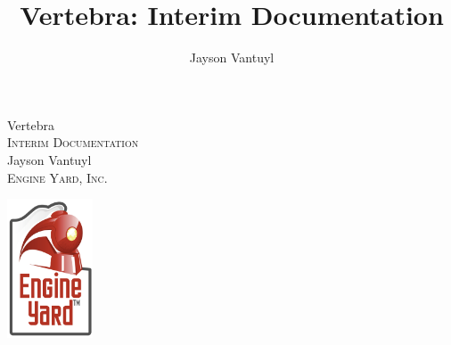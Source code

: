 \title{Vertebra: Interim Documentation}
\author{Jayson Vantuyl}

\begin{titlepage}
\begin{center}

{\LARGE Vertebra}\\[0.5cm]
\textsc{Interim Documentation}\\[2.5cm]

Jayson Vantuyl\\[0.5cm]

\textsc{Engine Yard, Inc.}

\vfill

\includegraphics[width=1in]{figs/png/eylogo}
\end{center}
\end{titlepage}
